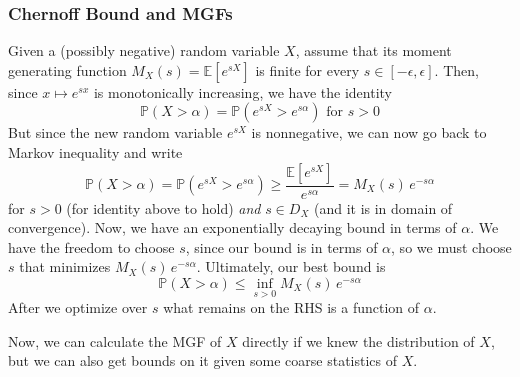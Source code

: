 \documentclass{article}
\begin{document}
    \subsubsection{Chernoff Bound and MGFs}

      \begin{theorem}
        Given a (possibly negative) random variable $X$, assume that its moment generating function $M_X (s) = \mathbb{E}[e^{s X}]$ is finite for every $s \in [-\epsilon, \epsilon]$. Then, since $x \mapsto e^{s x}$ is monotonically increasing, we have the identity 
        \begin{equation}
          \mathbb{P}(X > \alpha) = \mathbb{P}(e^{s X} > e^{s \alpha}) \text{ for } s > 0
        \end{equation}
        But since the new random variable $e^{s X}$ is nonnegative, we can now go back to Markov inequality and write 
        \begin{equation}
          \mathbb{P}(X > \alpha) = \mathbb{P}(e^{s X} > e^{s \alpha}) \geq \frac{\mathbb{E}[e^{s X}]}{e^{s \alpha}} = M_X (s) \, e^{-s \alpha}
        \end{equation}
        for $s > 0$ (for identity above to hold) \textit{and} $s \in D_X$ (and it is in domain of convergence). Now, we have an exponentially decaying bound in terms of $\alpha$. We have the freedom to choose $s$, since our bound is in terms of $\alpha$, so we must choose $s$ that minimizes $M_X (s) \, e^{-s \alpha}$. Ultimately, our best bound is 
        \begin{equation}
          \mathbb{P}(X > \alpha) \leq \inf_{s > 0} M_X (s) \, e^{-s \alpha}
        \end{equation}
        After we optimize over $s$ what remains on the RHS is a function of $\alpha$. 
      \end{theorem}

      Now, we can calculate the MGF of $X$ directly if we knew the distribution of $X$, but we can also get bounds on it given some coarse statistics of $X$. 
\end{document}
